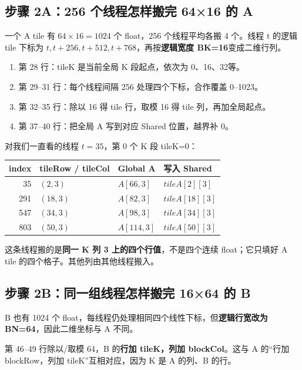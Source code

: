 \subsection{步骤 2A：256 个线程怎样搬完 64×16 的 A}
一个 A tile 有 $64\times16=1024$ 个 float，256 个线程平均各搬 4 个。线程 t 的逻辑 tile 下标为 $t,t+256,t+512,t+768$，再按\textbf{逻辑宽度 BK=16}变成二维行列。

\begin{enumerate}
\item 第 28 行：tileK 是当前全局 K 段起点，依次为 0、16、32等。
\item 第 29--31 行：每个线程间隔 256 处理四个下标，合作覆盖 0--1023。
\item 第 32--35 行：除以 16 得 tile 行，取模 16 得 tile 列，再加全局起点。
\item 第 37--40 行：把全局 A 写到对应 Shared 位置，越界补 0。
\end{enumerate}
对我们一直看的线程 $t=35$，第 0 个 K 段 tileK=0：
\begin{table}[H]\centering\small
\begin{tabular}{rlll}
\toprule
index & tileRow / tileCol & Global A & 写入 Shared\\\midrule
35 & $(2,3)$ & $A[66,3]$ & $tileA[2][3]$\\
291 & $(18,3)$ & $A[82,3]$ & $tileA[18][3]$\\
547 & $(34,3)$ & $A[98,3]$ & $tileA[34][3]$\\
803 & $(50,3)$ & $A[114,3]$ & $tileA[50][3]$\\\bottomrule
\end{tabular}
\end{table}
这条线程搬的是\textbf{同一 K 列 3 上的四个行值}，不是四个连续 float；它只填好 A tile 的四个格子。其他列由其他线程搬入。
\pagebreakhere

\subsection{步骤 2B：同一组线程怎样搬完 16×64 的 B}
B 也有 1024 个 float，每线程仍处理相同四个线性下标，但\textbf{逻辑行宽改为 BN=64}，因此二维坐标与 A 不同。

第 46--49 行除以/取模 64，B 的\textbf{行加 tileK，列加 blockCol}。这与 A 的“行加 blockRow，列加 tileK”互相对应，因为 K 是 A 的列、B 的行。

